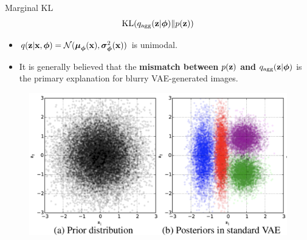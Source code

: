 \documentclass{beamer}
\begin{document}
\begin{frame}{Marginal KL}
	\[
		\mathrm{KL}(q_{\text{agg}}(\mathbf{z} | \boldsymbol{\phi}) \| p(\mathbf{z}))
	\]
	\vspace{-0.5cm}
	\begin{itemize}
		\item $q(\mathbf{z} | \mathbf{x}, \boldsymbol{\phi}) = \mathcal{N}(\boldsymbol{\mu}_{\boldsymbol{\phi}}(\mathbf{x}), \boldsymbol{\sigma}^2_{\boldsymbol{\phi}}(\mathbf{x}))$ is unimodal. 
		\item It is generally believed that the \textbf{mismatch between} $p(\mathbf{z})$  \textbf{and} $q_{\text{agg}}(\mathbf{z} | \boldsymbol{\phi})$  is the primary explanation for blurry VAE-generated images.
	\end{itemize}
	\begin{figure}
		\includegraphics[width=0.8\linewidth]{figs/agg_posterior}
	\end{figure}
\end{frame}
\end{document}
